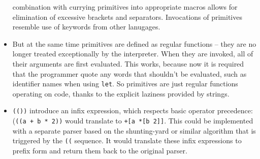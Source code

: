 \begin{itemize}
    combination with currying primitives into appropriate macros allows for
    elimination of excessive brackets and separators. Invocations of
    primitives resemble use of keywords from other lanugages.
    \item But at the same time primitives are defined as regular functions --
    they are no longer treated exceptionally by the interpreter. When they are
    invoked, all of their arguments are first evaluated. This works, because
    now it is required that the programmer quote any words that shouldn't be
    evaluated, such as identifier names when using \texttt{let}. So primitives
    are just regular functions operating on code, thanks to the explicit
    laziness provided by strings.
    \item \texttt{(())} introduce an infix expression, which respects basic
    operator precedence: (\texttt{((a + b * 2))} would translate to
    \texttt{+[a *[b 2]]}. This could be implemented with a separate parser
    based on the
    shunting-yard\cite{shunting_yard} or
    similar algorithm that is triggered by the \texttt{((} sequence. It would
    translate these infix expressions to prefix form and return them back to
    the original parser.
\end{itemize}